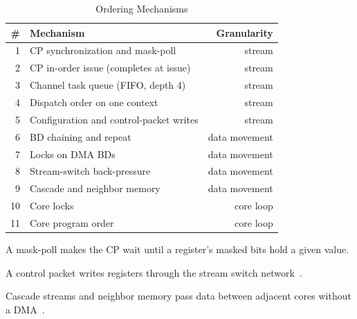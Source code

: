 \begin{table}[h]
    \centering
    \caption{Ordering Mechanisms}
    \label{tab:mech}
    \begin{threeparttable}
    \begin{tabular*}{\linewidth}{@{\extracolsep{\fill}}rlr}
        \toprule
        \# & Mechanism & Granularity \\
        \midrule
        1 & CP synchronization and mask-poll & stream \\
        2 & CP in-order issue (completes at issue) & stream \\
        3 & Channel task queue (FIFO, depth 4) & stream \\
        4 & Dispatch order on one context & stream \\
        5 & Configuration and control-packet writes & stream \\
        6 & BD chaining and repeat & data movement \\
        7 & Locks on DMA BDs & data movement \\
        8 & Stream-switch back-pressure & data movement \\
        9 & Cascade and neighbor memory & data movement \\
        10 & Core locks & core loop \\
        11 & Core program order & core loop \\
        \bottomrule
    \end{tabular*}
    \begin{tablenotes}\footnotesize
    \item A mask-poll makes the CP wait until a register's masked bits hold a given value.
    \item A control packet writes registers through the stream switch network~\citep{amd_am027}.
    \item Cascade streams and neighbor memory pass data between adjacent cores without a DMA~\citep{amd_am027}.
    \end{tablenotes}
    \end{threeparttable}
\end{table}


